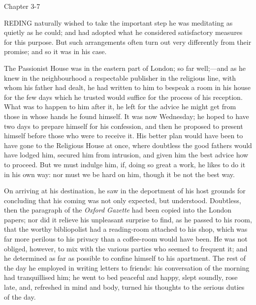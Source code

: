 Chapter 3-7


REDING naturally wished to take the
important step he was meditating as quietly as he could; and had
adopted what he considered satisfactory measures for this purpose. But
such arrangements often turn out very differently from their promise;
and so it was in his case.

The Passionist House was in the eastern part of London; so far
well;—and as he knew in the neighbourhood a respectable publisher in
the religious line, with whom his father had dealt, he had written to
him to bespeak a room in his house for the few days which he trusted
would suffice for the process of his reception. What was to happen to
him after it, he left for the advice he might get from those in whose
hands he found himself. It was now Wednesday; he hoped to have two
days to prepare himself for his confession, and then he proposed to
present himself before those who were to receive it. His better plan
would have been to have gone to the Religious House at once, where
doubtless the good fathers would have lodged him, secured him from
intrusion, and given him the best advice how to proceed. But we must
indulge him, if, doing so great a work, he likes to do it in his
own way: nor must we be hard on him, though it be not the best way.

On arriving at his destination, he saw in the deportment of his
host grounds for concluding that his coming was not only expected, but
understood. Doubtless, then the paragraph of the \emph{Oxford Gazette}
had been copied into the London papers; nor did it relieve his
unpleasant surprise to find, as he passed to his room, that the worthy
bibliopolist had a reading-room attached to his shop, which was far
more perilous to his privacy than a coffee-room would have been. He
was not obliged, however, to mix with the various parties who seemed
to frequent it; and he determined as far as possible to confine
himself to his apartment. The rest of the day he employed in writing
letters to friends: his conversation of the morning had tranquillised
him; he went to bed peaceful and happy, slept soundly, rose late, and,
refreshed in mind and body, turned his thoughts to the serious duties
of the day.

